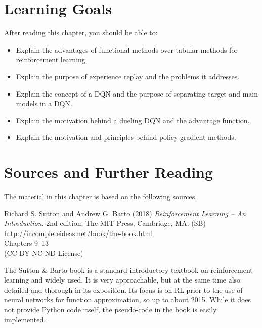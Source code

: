 %
%
\section*{Learning Goals}

After reading this chapter, you should be able to:
\begin{itemize}
    \item Explain the advantages of functional methods over tabular methods for reinforcement learning. 
    \item Explain the purpose of experience replay and the problems it addresses.
    \item Explain the concept of a DQN and the purpose of separating target and main models in a DQN.
    \item Explain the motivation behind a dueling DQN and the advantage function. 
    \item Explain the motivation and principles behind policy gradient methods.
\end{itemize}


\section*{Sources and Further Reading}

The material in this chapter is based on the following sources. 

\begin{resourcebox}
Richard S. Sutton and Andrew G. Barto (2018) \emph{Reinforcement Learning -- An Introduction}. 2nd edition, The MIT Press, Cambridge, MA. (SB) \\
\vspace{0.5\baselineskip}
\small\url{http://incompleteideas.net/book/the-book.html}\normalsize \\
\vspace{0.5\baselineskip}
Chapters 9--13 \\
\vspace{0.5\baselineskip}
(CC BY-NC-ND License)
\end{resourcebox}

The Sutton \& Barto book is a standard introductory textbook on reinforcement learning and widely used. It is very approachable, but at the same time also detailed and thorough in its exposition. Its focus is on RL prior to the use of neural networks for function approximation, so up to about 2015. While it does not provide Python code itself, the pseudo-code in the book is easily implemented.


